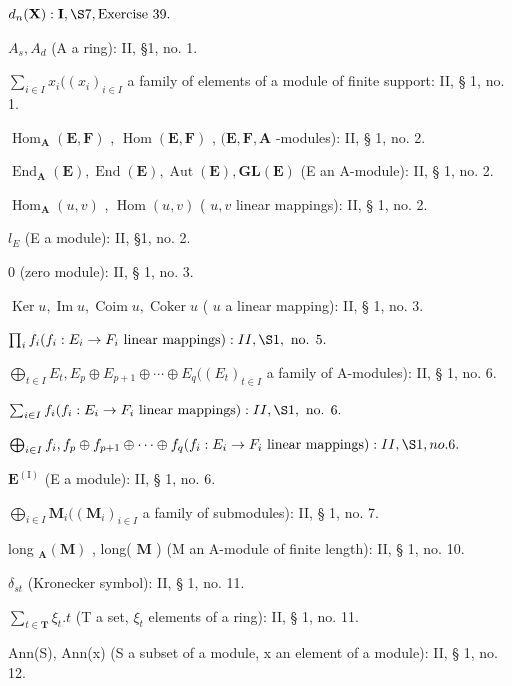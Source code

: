 \(d_{n}(\mathbf{X}) : \mathbf{I}, \S 7, \text{Exercise 39.}\)

\(A_{s}, A_{d}\) (A a ring): II, §1, no. 1.

\(\sum_{i \in I} x_i((x_i)_{i \in I}\) a family of elements of a module of finite support: II, § 1, no. 1.

\(\operatorname{Hom}_{\mathbf{A}}(\mathbf{E}, \mathbf{F})\) , \(\operatorname{Hom}(\mathbf{E}, \mathbf{F})\) , \((\mathbf{E}, \mathbf{F}, \mathbf{A}\) -modules): II, § 1, no. 2.

\(\operatorname{End}_{\mathbf{A}}(\mathbf{E}), \operatorname{End}(\mathbf{E}), \operatorname{Aut}(\mathbf{E}), \mathbf{GL}(\mathbf{E})\) (E an A-module): II, § 1, no. 2.

\(\operatorname{Hom}_{\mathbf{A}}(u, v)\) , \(\operatorname{Hom}(u, v)\) ( \(u, v\) linear mappings): II, § 1, no. 2.

\(l_{E}\) (E a module): II, §1, no. 2.

0 (zero module): II, § 1, no. 3.

\(\operatorname{Ker} u, \operatorname{Im} u, \operatorname{Coim} u, \operatorname{Coker} u\) ( \(u\) a linear mapping): II, § 1, no. 3.

\(\prod_{i}f_{i}(f_{i}:E_{i}\to F_{i}\text{ linear mappings}):II,\S 1,\text{ no. }5.\)

\(\bigoplus_{t \in I} E_t, E_p \oplus E_{p+1} \oplus \cdots \oplus E_q ((E_t)_{t \in I}\) a family of A-modules): II, § 1, no. 6.

\(\sum_{i \in I} f_i (f_i: E_i \to F_i \text{ linear mappings}): II, \S 1, \text{ no. } 6.\)

\(\bigoplus_{i\in I}f_{i},f_{p}\oplus f_{p+1}\oplus\cdots\oplus f_{q}(f_{i}:E_{i}\to F_{i}\text{ linear mappings}):II,\S 1,no.6.\)

\(\mathbf{E}^{(\mathrm{I})}\) (E a module): II, § 1, no. 6.

\(\bigoplus_{i \in I} \mathbf{M}_i ((\mathbf{M}_i)_{i \in I}\) a family of submodules): II, § 1, no. 7.

long \(_{\mathbf{A}}(\mathbf{M})\) , long( \(\mathbf{M}\) ) (M an A-module of finite length): II, § 1, no. 10.

\(\delta_{st}\) (Kronecker symbol): II, § 1, no. 11.

\(\sum_{t \in \mathbf{T}} \xi_t. t\) (T a set, \(\xi_t\) elements of a ring): II, § 1, no. 11.

Ann(S), Ann(x) (S a subset of a module, x an element of a module): II, § 1, no. 12.

